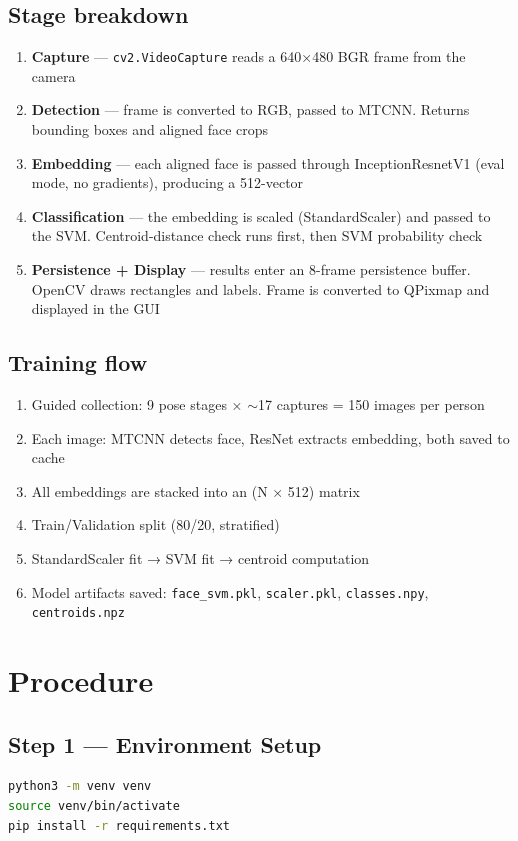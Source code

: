\documentclass[12pt,a4paper]{article}
\begin{document}
\subsection*{Stage breakdown}
\begin{enumerate}
    \item \textbf{Capture} --- \texttt{cv2.VideoCapture} reads a 640×480 BGR frame from the camera
    \item \textbf{Detection} --- frame is converted to RGB, passed to MTCNN. Returns bounding boxes and aligned face crops
    \item \textbf{Embedding} --- each aligned face is passed through InceptionResnetV1 (eval mode, no gradients), producing a 512-vector
    \item \textbf{Classification} --- the embedding is scaled (StandardScaler) and passed to the SVM. Centroid-distance check runs first, then SVM probability check
    \item \textbf{Persistence + Display} --- results enter an 8-frame persistence buffer. OpenCV draws rectangles and labels. Frame is converted to QPixmap and displayed in the GUI
\end{enumerate}

\subsection*{Training flow}
\begin{enumerate}
    \item Guided collection: 9 pose stages × $\sim$17 captures = 150 images per person
    \item Each image: MTCNN detects face, ResNet extracts embedding, both saved to cache
    \item All embeddings are stacked into an (N × 512) matrix
    \item Train/Validation split (80/20, stratified)
    \item StandardScaler fit → SVM fit → centroid computation
    \item Model artifacts saved: \texttt{face\_svm.pkl}, \texttt{scaler.pkl}, \texttt{classes.npy}, \texttt{centroids.npz}
\end{enumerate}

\section{Procedure}

\subsection{Step 1 --- Environment Setup}
\begin{lstlisting}[language=bash]
python3 -m venv venv
source venv/bin/activate
pip install -r requirements.txt
\end{lstlisting}
\end{document}

